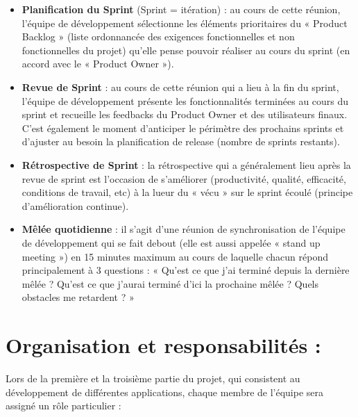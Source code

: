 \documentclass[a4paper,11pt,french]{article}
\begin{document}
\begin{itemize}
\item \textbf{Planification du Sprint} (Sprint = itération) : au cours de cette réunion, l’équipe de développement sélectionne les éléments prioritaires du « Product Backlog » (liste ordonnancée des exigences fonctionnelles et non fonctionnelles du projet) qu’elle pense pouvoir réaliser au cours du sprint (en accord avec le « Product Owner »).
\item \textbf{Revue de Sprint} : au cours de cette réunion qui a lieu à la fin du sprint, l’équipe de développement présente les fonctionnalités terminées au cours du sprint et recueille les feedbacks du Product Owner et des utilisateurs finaux. C’est également le moment d’anticiper le périmètre des prochains sprints et d’ajuster au besoin la planification de release (nombre de sprints restants).
\item \textbf{Rétrospective de Sprint} : la rétrospective qui a généralement lieu après la revue de sprint est l’occasion de s’améliorer (productivité, qualité, efficacité, conditions de travail, etc) à la lueur du « vécu » sur le sprint écoulé (principe d’amélioration continue).
\item \textbf{Mêlée quotidienne} : il s’agit d’une réunion de synchronisation de l’équipe de développement qui se fait debout (elle est aussi appelée « stand up meeting ») en 15 minutes maximum au cours de laquelle chacun répond principalement à 3 questions : « Qu’est ce que j’ai terminé depuis la dernière mêlée ? Qu’est ce que j’aurai terminé d’ici la prochaine mêlée ? Quels obstacles me retardent ? »
\end{itemize}



\section{Organisation et responsabilités :}

Lors de la première et la troisième partie du projet, qui consistent au développement de différentes applications, chaque membre de l'équipe sera assigné un rôle particulier :\\
\end{document}
